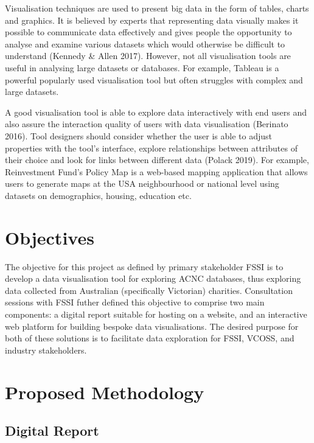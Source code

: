 \documentclass[11pt,]{article}
\begin{document}
Visualisation techniques are used to present big data in the form of
tables, charts and graphics. It is believed by experts that representing
data visually makes it possible to communicate data effectively and
gives people the opportunity to analyse and examine various datasets
which would otherwise be difficult to understand (Kennedy \& Allen
2017). However, not all visualisation tools are useful in analysing
large datasets or databases. For example, Tableau is a powerful
popularly used visualisation tool but often struggles with complex and
large datasets.

A good visualisation tool is able to explore data interactively with end
users and also assure the interaction quality of users with data
visualisation (Berinato 2016). Tool designers should consider whether
the user is able to adjust properties with the tool's interface, explore
relationships between attributes of their choice and look for links
between different data (Polack 2019). For example, Reinvestment Fund's
Policy Map is a web-based mapping application that allows users to
generate maps at the USA neighbourhood or national level using datasets
on demographics, housing, education etc.

\newpage

\section{Objectives}\label{objectives}

The objective for this project as defined by primary stakeholder FSSI is
to develop a data visualisation tool for exploring ACNC databases, thus
exploring data collected from Australian (specifically Victorian)
charities. Consultation sessions with FSSI futher defined this objective
to comprise two main components: a digital report suitable for hosting
on a website, and an interactive web platform for building bespoke data
visualisations. The desired purpose for both of these solutions is to
facilitate data exploration for FSSI, VCOSS, and industry stakeholders.

\section{Proposed Methodology}\label{proposed-methodology}

\subsection{Digital Report}\label{digital-report}
\end{document}
